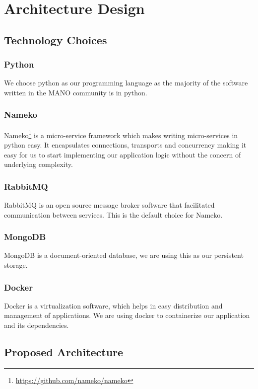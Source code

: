 \chapter{Architecture Design}
\label{ch:Architecture Design}

\section{Technology Choices}

\subsection{Python}
We choose python as our programming language as the majority of the software written in the MANO community is in python.

\subsection{Nameko}
Nameko\footnote{\url{https://github.com/nameko/nameko}} is a micro-service framework which makes writing micro-services in python easy. It encapsulates connections, transports and concurrency making it easy for us to start implementing our application logic without the concern of underlying complexity.


\subsection{RabbitMQ}
RabbitMQ is an open source message broker software that facilitated communication between services. This is the default choice for Nameko.


\subsection{MongoDB}
MongoDB is a document-oriented database, we are using this as our persistent storage.

\subsection{Docker}
Docker is a virtualization software, which helps in easy distribution and management of applications. We are using docker to containerize our application and its dependencies.

\section{Proposed Architecture}

